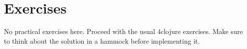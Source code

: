 \documentclass[11pt,a4paper]{article}
\begin{document}
\section{Exercises}

No practical exercises here.
Proceed with the usual 4clojure exercises.
Make sure to think about the solution in a hammock before implementing it.

%
%
%
%
%
%
%
\end{document}
